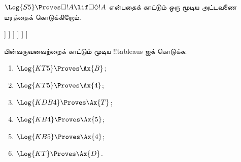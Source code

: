 \documentclass[../../../include/open-logic-section]{subfiles}
\begin{document}
\begin{ex}
  $\Log{S5} \Proves \Box!A \lif \Box\Diamond!A$ என்பதைக் காட்டும் ஒரு
  மூடிய அட்டவணை மரத்தைக் கொடுக்கிறோம்.
  \begin{oltableau}
    [\pFmla{\False}{\Box\formula{A} \lif \Box\Diamond \formula{A}}{1},
      just = \TAss
      [\pFmla{\True}{\Box \formula{A}}{1}, just = {\TRule{\False}{\lif}[1]}
        [\pFmla{\False}{\Box\Diamond \formula{A}}{1},
          just = {\TRule{\False}{\lif}[1]}
          [\pFmla{\False}{\Diamond \formula{A}}{1.1},
            just = {\TRule{\False}{\Box}[3]}
            [\pFmla{\False}{\Diamond \formula{A}}{1},
              just = {4r$\Diamond$ 4}
              [\pFmla{\False}{\formula{A}}{1.1},
                just = {\TRule{\False}{\Diamond}[5]}
                [\pFmla{\True}{\formula{A}}{1.1},
                  just = {\TRule{\True}{\Box}[2]}, close]
              ]
            ]
          ]
        ]
      ]
    ]
  \end{oltableau}
\end{ex}

\begin{prob}
பின்வருவனவற்றைக் காட்டும் மூடிய !!{tableau}s ஐக் கொடுக்க:
  \begin{enumerate}
  \item $\Log{KT5} \Proves \Ax{B}$;
  \item $\Log{KT5} \Proves \Ax{4}$;
  \item $\Log{KDB4} \Proves \Ax{T}$;
  \item $\Log{KB4} \Proves \Ax{5}$;
  \item $\Log{KB5} \Proves \Ax{4}$;
  \item $\Log{KT} \Proves \Ax{D}$.
  \end{enumerate}
\end{prob}
\end{document}
